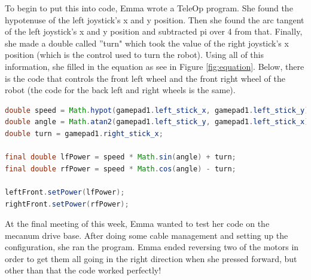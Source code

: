 \documentclass{article}
\begin{document}
To begin to put this into code, Emma wrote a TeleOp program. She found the hypotenuse of the left joystick's x and y position. Then she found the arc tangent of the left joystick's x and y position and subtracted pi over 4 from that. Finally, she made a double called ''turn" which took the value of the right joystick's x position (which is the control used to turn the robot). Using all of this information, she filled in the equation as see in Figure \ref{fig:equation}. Below, there is the code that controls the front left wheel and the front right wheel of the robot (the code for the back left and right wheels is the same). 

\begin{lstlisting}[language=Java]
double speed = Math.hypot(gamepad1.left_stick_x, gamepad1.left_stick_y);
double angle = Math.atan2(gamepad1.left_stick_y, gamepad1.left_stick_x);
double turn = gamepad1.right_stick_x;

final double lfPower = speed * Math.sin(angle) + turn;
final double rfPower = speed * Math.cos(angle) - turn;

leftFront.setPower(lfPower);
rightFront.setPower(rfPower);
\end{lstlisting}

At the final meeting of this week, Emma wanted to test her code on the mecanum drive base. After doing some cable management and setting up the configuration, she ran the program. Emma ended reversing two of the motors in order to get them all going in the right direction when she pressed forward, but other than that the code worked perfectly! 
\end{document}
